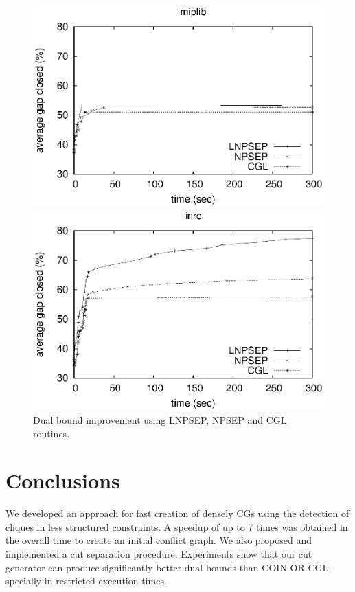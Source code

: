 \documentclass{endm}
\begin{document}
\begin{figure}	
	\begin{minipage}[h]{.5\textwidth}
		\begin{center}
			\includegraphics[width=1\textwidth]{miplib.eps}
		\end{center}
	\end{minipage}
	\begin{minipage}[h]{.5\textwidth}
		\begin{center}
			\includegraphics[width=1\textwidth]{nurse.eps}
		\end{center}
	\end{minipage}
	\caption{Dual bound improvement using LNPSEP, NPSEP and CGL routines.}
	\label{figExperiments}
\end{figure}

\section{Conclusions}\label{conclusions}

We developed an approach for fast creation of densely CGs using the detection of cliques in less structured constraints. A speedup of up to 7 times was obtained in the overall time to create an initial conflict graph. We also proposed and implemented a cut separation procedure. Experiments show that our cut generator can produce significantly better dual bounds than COIN-OR CGL, specially in restricted execution times.



\end{document}
